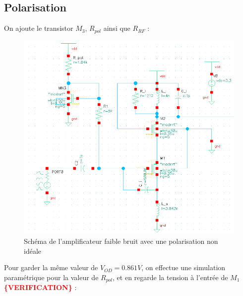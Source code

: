 \documentclass[a4paper]{article}
\begin{document}
\clearpage

\subsection{Polarisation}

On ajoute le transistor $M_3$, $R_{pol}$ ainsi que $R_{RF}$ :

\begin{figure}[!htb]
\begin{center}
  \includegraphics[scale=0.35]{schema-polarization.png}
  \caption{Sch\'ema de l'amplificateur faible bruit avec une polarisation non id\'eale}
  \label{schema-pol}
\end{center}
\end{figure}

Pour garder la m\^eme valeur de $V_{OD} = 0.861V$, on effectue une simulation param\'etrique
pour la valeur de $R_{pol}$, et en regarde la tension \`a l'entr\'ee de $M_{1}$ \textbf{\textcolor{red}{ \{VERIFICATION\}}} :
\end{document}

